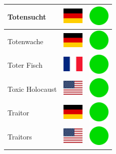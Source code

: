 \documentclass[12pt, a4paper, twoside]{report}
\begin{document}
\begin{center}
\begin{longtable}{|p{5cm}|p{2cm}|p{2cm}|}
 Totensucht                                                 & \includegraphics[width=1cm]{../img/flags/de} &   \includegraphics[width=1cm]{../likes/y} \\ \hline
 Totenwache                                                 & \includegraphics[width=1cm]{../img/flags/de} &   \includegraphics[width=1cm]{../likes/y} \\ \hline
 Toter Fisch                                                & \includegraphics[width=1cm]{../img/flags/fr} &   \includegraphics[width=1cm]{../likes/y} \\ \hline
 Toxic Holocaust                                            & \includegraphics[width=1cm]{../img/flags/us} &   \includegraphics[width=1cm]{../likes/y} \\ \hline
 Traitor                                                    & \includegraphics[width=1cm]{../img/flags/de} &   \includegraphics[width=1cm]{../likes/y} \\ \hline
 Traitors                                                   & \includegraphics[width=1cm]{../img/flags/us} &   \includegraphics[width=1cm]{../likes/y} \\ \hline

\end{longtable}
\end{center}
\end{document}
